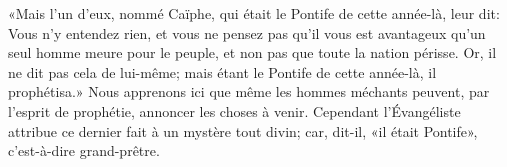 «Mais l’un d’eux, nommé Caïphe,
	qui était le Pontife de cette année-là, leur dit:
	Vous n’y entendez rien,
	et vous ne pensez pas qu’il vous est avantageux
		qu’un seul homme meure pour le peuple,
	et non pas que toute la nation périsse.
Or, il ne dit pas cela de lui-même;
	mais étant le Pontife de cette année-là, il prophétisa.»
Nous apprenons ici que même les hommes méchants
	peuvent, par l’esprit de prophétie, annoncer les choses à venir.
Cependant l’Évangéliste attribue ce dernier fait à un mystère tout divin;
	car, dit-il, «il était Pontife», c’est-à-dire grand-prêtre.
